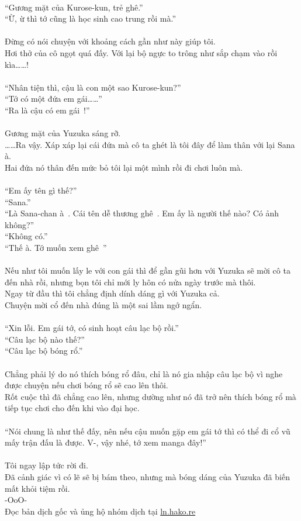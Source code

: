 \documentclass[12pt,a4paper, twosides]{book}
\begin{document}
\\
“Gương mặt của Kurose-kun, trẻ ghê.”\\
“Ừ, ừ thì tớ cũng là học sinh cao trung rồi mà.”\\
\\
Đừng có nói chuyện với khoảng cách gần như này giúp tôi.\\
Hơi thở của cô ngọt quá đấy. Với lại bộ ngực to trông như sắp chạm vào rồi kìa……!\\
\\
“Nhân tiện thì, cậu là con một sao Kurose-kun?”\\
“Tớ có một đứa em gái……”\\
“Ra là cậu có em gái~!”\\
\\
Gương mặt của Yuzuka sáng rỡ.\\
……Ra vậy. Xáp xáp lại cái đứa mà cô ta ghét là tôi đây để làm thân với lại Sana à.\\
Hai đứa nó thân đến mức bỏ tôi lại một mình rồi đi chơi luôn mà.\\
\\
“Em ấy tên gì thế?”\\
“Sana.”\\
“Là Sana-chan à~. Cái tên dễ thương ghê~. Em ấy là người thế nào? Có ảnh không?”\\
“Không có.”\\
“Thế à. Tớ muốn xem ghê~”\\
\\
Nếu như tôi muốn lấy le với con gái thì để gần gũi hơn với Yuzuka sẽ mời cô ta đến nhà rồi, nhưng bọn tôi chỉ mới ly hôn có nửa ngày trước mà thôi.\\
Ngay từ đầu thì tôi chẳng định dính dáng gì với Yuzuka cả.\\
Chuyện mời cổ đến nhà đúng là một sai lầm ngớ ngẩn.\\
\\
“Xin lỗi. Em gái tớ, có sinh hoạt câu lạc bộ rồi.”\\
“Câu lạc bộ nào thế?”\\
“Câu lạc bộ bóng rổ.”\\
\\
Chẳng phải lý do nó thích bóng rổ đâu, chỉ là nó gia nhập câu lạc bộ vì nghe được chuyện nếu chơi bóng rổ sẽ cao lên thôi.\\
Rốt cuộc thì đã chẳng cao lên, nhưng dường như nó đã trở nên thích bóng rổ mà tiếp tục chơi cho đến khi vào đại học.\\
\\
“Nói chung là như thế đấy, nên nếu cậu muốn gặp em gái tớ thì có thể đi cổ vũ mấy trận đấu là được. V-, vậy nhé, tớ xem manga đây!”\\
\\
Tôi ngay lập tức rời đi.\\
Đã cảnh giác vì có lẽ sẽ bị bám theo, nhưng mà bóng dáng của Yuzuka đã biến mất khỏi tiệm rồi.\\
-OoO-\\
Đọc bản dịch gốc và ủng hộ nhóm dịch tại \href{https://ln.hako.re/}{ln.hako.re}\\
\newpage
\end{document}
